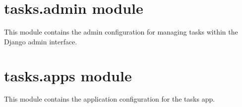 \documentclass[letterpaper,10pt,english]{sphinxmanual}
\begin{document}
\section{tasks.admin module}
\label{\detokenize{tasks:tasks-admin-module}}
\sphinxAtStartPar
This module contains the admin configuration for managing tasks within the Django admin interface.

\section{tasks.apps module}
\label{\detokenize{tasks:tasks-apps-module}}\label{\detokenize{tasks:module-tasks.admin}}
\sphinxAtStartPar
This module contains the application configuration for the tasks app.
\label{\detokenize{tasks:module-tasks.apps}}
\end{document}
